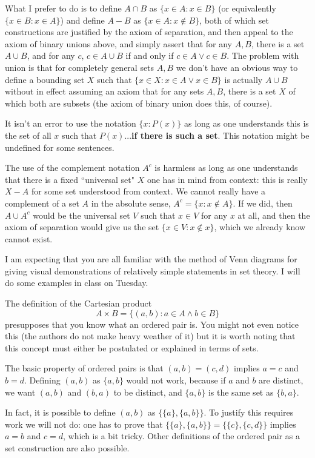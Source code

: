 \documentclass[12pt]{article}
\begin{document}
What I prefer to do is to define $A \cap B$ as $\{x \in A:x \in B\}$ (or equivalently $\{x \in B:x \in A\}$) and
define $A - B$ as $\{x \in A:x \not\in B\}$, both of which set constructions are justified by the axiom of separation, and then appeal to the axiom of binary unions above, and simply assert that for any $A,B$, there is a set $A \cup B$, and for any $c$,
$c \in A \cup B$ if and only if $c \in A \vee c \in B$.  The problem with union is that for completely general sets $A,B$ we don't have an obvious way to define a bounding set $X$ such that $\{x \in X:x \in A \vee x \in B\}$ is actually $A \cup B$ without in effect assuming an axiom that for any sets $A,B$, there is a set $X$ of which both are subsets (the axiom of binary union does this, of course).

It isn't an error to use the notation $\{x:P(x)\}$ as long as one understands this is the set of all $x$ such that $P(x)$...{\bf if there is such a set}.  This notation might be undefined for some sentences.

The use of the complement notation $A^c$ is harmless as long as one understands that there is a fixed ``universal set" $X$  one has in mind from context:  this is really $X - A$ for some set understood from context.  We cannot really have a complement of a set $A$ in the absolute sense, $A^c = \{x:x \not\in A\}$.  If we did, then $A \cup A^c$ would be the universal set $V$ such that $x \in V$ for any $x$ at all, and then the axiom of separation would give us the set $\{x \in V:x \not\in x\}$, which we already know cannot exist.

I am expecting that you are all familiar with the method of Venn diagrams for giving visual demonstrations of relatively simple statements in set theory.  I will do some examples in class on Tuesday.

The definition of the Cartesian product $$A \times B = \{(a,b):a \in A \wedge b \in B\}$$ presupposes that you know what an ordered pair is.  You might not even notice this (the authors do not make heavy weather of it) but it is worth noting that this concept must either be postulated or explained in terms of sets.

The basic property of ordered pairs is that $(a,b) = (c,d)$ implies $a=c$ and $b=d$.  Defining $(a,b)$ as $\{a,b\}$ would not work, because if $a$ and $b$ are distinct, we want $(a,b)$ and $(b,a)$ to be distinct, and $\{a,b\}$ is the same set as $\{b,a\}$.

In fact, it is possible to define $(a,b)$ as $\{\{a\},\{a,b\}\}$.  To justify this requires work we will not do:  one has to prove that $\{\{a\},\{a,b\}\}=\{\{c\},\{c,d\}\}$ implies $a=b$ and $c=d$, which is a bit tricky.  Other definitions of the ordered pair as a set construction are also possible.
\end{document}
